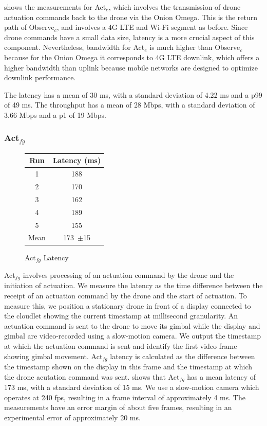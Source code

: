  shows the measurements for Act$_e$, which
involves the transmission of drone actuation commands back to the drone via the
Onion Omega. This is the return path of Observe$_c$, and involves a 4G LTE and
Wi-Fi segment as before. Since drone commands have a small data size, latency
is a more crucial aspect of this component. Nevertheless, bandwidth for Act$_e$
is much higher than Observe$_c$ because for the Onion Omega it corresponds to
4G LTE downlink, which offers a higher bandwidth than uplink because mobile
networks are designed to optimize downlink performance.

The latency has a mean of 30 ms, with a standard deviation of 4.22 ms and a
p99 of 49 ms. The throughput has a mean of 28 Mbps, with a standard deviation
of 3.66 Mbps and a p1 of 19 Mbps.

\subsubsection{\texorpdfstring{Act$_{fg}$}{Act\_fg}}
\label{sec:onion-act-fg}

\begin{figure}
\centering
    \begin{tabular}{@{}cc@{}}
\toprule
Run & Latency (ms)\\
\midrule
 1&188\\
 2&170\\
 3&162\\
 4&189\\
 5&155\\
\midrule
Mean& 173~{\small$\pm$15}\\
\bottomrule
\end{tabular}
\caption{\small Act$_{fg}$  Latency}
\label{fig:act-fg-latency}
\end{figure}
Act$_{fg}$ involves processing of an actuation command by the drone and the
initiation of actuation. We measure the latency as the time difference between
the receipt of an actuation command by the drone and the start of actuation.
To measure this, we position a stationary drone in front of a display connected
to the cloudlet showing the current timestamp at millisecond granularity.  An
actuation command is sent to the drone to move its gimbal while the display and
gimbal are video-recorded using a slow-motion camera. We output the timestamp
at which the actuation command is sent and identify the first video frame
showing gimbal movement. Act$_{fg}$ latency is calculated as the difference
between the timestamp shown on the display in this frame and the timestamp at
which the drone acutation command was sent.  shows
that Act$_{fg}$ has a mean latency of 173 ms, with a standard deviation of 15
ms.  We use a slow-motion camera which operates at 240 fps, resulting in a
frame interval of approximately 4 ms. The measurements have an error margin of
about five frames, resulting in an experimental error of approximately 20 ms.


